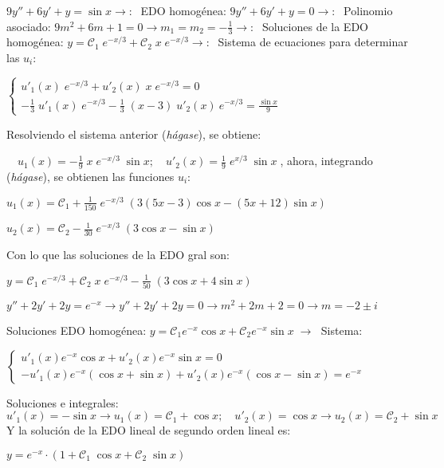 \begin{cuadro-gris}
\begin{ejem}
$9y''+6y'+y=\sin x \to : \; $ EDO homogénea: $9y''+6y'+y=0 \to :\; $  Polinomio asociado: $9m^2+6m+1=0 \to m_1=m_2=-\frac 1 3 \to : \; $ Soluciones de la EDO homogénea: $y=\mathcal{C}_1 \; e^{-x/3} + \mathcal{C}_2 \; x \; e^{-x/3} \to :\; $	Sistema de ecuaciones para determinar las $u_i$:

$\begin{cases}
u'_1(x)\; e^{-x/3} + u'_2(x) \; x \; e^{-x/3} = 0 \\
-\frac 1 3 \; u'_1(x)\; e^{-x/3} - \frac 1 3 \; (x-3)\;  u'_2(x)\ e^{-x/3} = \frac {\sin x}{9} 	
\end{cases}$

Resolviendo el sistema anterior (\emph{hágase}), se obtiene:

$\quad u_1(x)=-\frac 1 9 \; x \; e^{-x/3}\; \sin x ; \quad  u'_2(x)= \frac 1 9 \; e^{x/3} \; \sin x\; $, ahora, integrando (\emph{hágase}), se obtienen las funciones $u_i$:

$u_1(x)=\mathcal{C}_1+\frac 1 {150}\;  e^{-x/3} \; \left( 3(5x-3)\cos x -(5x+12)\sin x \right)\;$

$u_2(x)=\mathcal{C}_2 - \frac 1 {30} \; e^{-x/3}\; (3\cos x-\sin x)$

Con lo que las soluciones de la EDO gral son:

\hspace{30mm} $y=\mathcal{C}_1 \; e^{-x/3}+\mathcal{C}_2 \; x \; e^{-x/3}- \frac 1 {50} \; (3\cos x + 4 \sin x)$

\end{ejem}
\end{cuadro-gris}

\begin{cuadro-gris}
\begin{ejem}
	$y''+2y'+2y=e^{-x} \to y''+2y'+2y=0 \to m^2+2m+2=0 \to m=-2 \pm i$

Soluciones EDO homogénea: $y=\mathcal{C}_1 e^{-x} \cos x + \mathcal{C}_2 e^{-x} \sin x \; \to \; $ Sistema:

$\begin{cases}
u'_1(x)e^{-x} \cos x + u'_2(x) e^{-x} \sin x = 0 \\
-u'_1(x) e^{-x} (\cos x + \sin x ) + u'_2(x) e^{-x} (\cos x - \sin x )=e^{-x}	
\end{cases}$

Soluciones e integrales: $u'_1(x)=-\sin x \to u_1(x)=\mathcal{C}_1 + \cos x ; \quad u'_2(x)=\cos x \to u_2(x)=\mathcal{C}_2 +\sin x$ Y la solución de la EDO lineal de segundo orden lineal es:

\hspace{30mm} $y=e^{-x}\cdot \left( 1+ \mathcal{C}_1 \; \cos x + \mathcal{C}_2 \; \sin x \right)$ 
\end{ejem}
\end{cuadro-gris}

